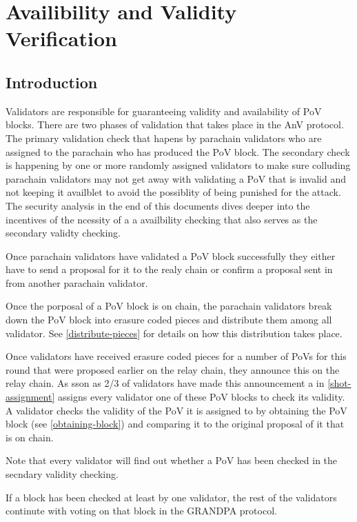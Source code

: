 \chapter{Availibility and Validity Verification}

\section{Introduction}
Validators are responsible for guaranteeing validity and availability of PoV blocks. 
There are two phases of validation that takes place in the AnV protocol. 
The primary validation check that hapens by parachain validators who are assigned to the parachain who has produced the PoV block. 
The secondary check is happening by one or more randomly assigned validators to make sure colluding parachain validators may not get away with validating a PoV that is invalid and not keeping it availblet to avoid the possiblity of being punished for the attack. 
The security analysis in the end of this documents dives deeper into the incentives of the ncessity of a a availbility checking that also serves as the secondary validty checking. 

Once parachain validators have validated a PoV block successfully they either have to send a proposal for it to the realy chain or confirm a proposal sent in from another parachain validator. 

Once the porposal of a PoV block is on chain, the parachain validators break down the PoV block into erasure coded pieces and distribute them among all validator. See \ref{distribute-pieces} for details on how this distribution takes place.

Once validators have received erasure coded pieces for a number of PoVs for this round that were proposed earlier on the relay chain, they announce this on the relay chain. As sson as 2/3 of validators have made this announcement a in \ref{shot-assignment} assigns every validator one of these PoV blocks to check its validity. A validator checks the validity of the PoV it is assigned to by obtaining the PoV block (see \ref{obtaining-block}) and comparing it to the original proposal of it that is on chain. 

Note that every validator will find out whether a PoV has been checked in the secndary validity checking. 

If a block has been checked at least by one validator, the rest of the validators continute with voting on that block in the GRANDPA protocol. 

